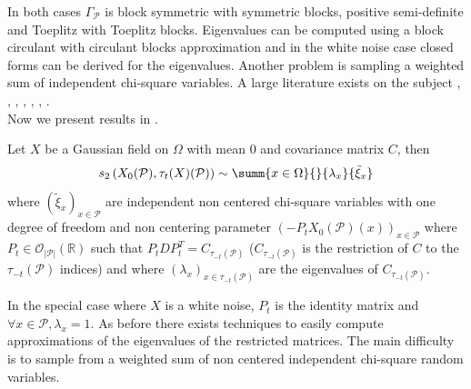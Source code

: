 In both cases $\Gamma_{\mathcal{P}}$ is block symmetric with symmetric blocks, positive semi-definite and Toeplitz with Toeplitz blocks. Eigenvalues can be computed using a block circulant with circulant blocks approximation and in the white noise case closed forms can be derived for the eigenvalues. Another problem is sampling a weighted sum of independent chi-square variables. A large literature exists on the subject \cite{wood1989f}, \cite{moschopoulos1984distribution}, \cite{box1954some}, \cite{imhof1961computing}, \cite{jensen1972gaussian}, \cite{kotz1967series}, \cite{bodenham2016comparison}.\\
Now we present results in \templatematching .
\begin{prop}
  Let $X$ be a Gaussian field on $\Omega$ with mean $0$ and covariance matrix
  $C$, then
  \[s_2\left(X_0(\mathcal{P}), \tau_t(X)(\mathcal{P}) \right) \sim \summ{x \in
      \Omega}{}{\lambda_x}{\tilde{\xi}_x}\] where
  $\left( \tilde{\xi}_x\right)_{x\in \mathcal{P}}$ are independent non centered
  chi-square variables with one degree of freedom and non centering parameter
  $\left(-P_t X_0(\mathcal{P}) (x) \right)_{x \in \mathcal{P}}$ where
  $P_t \in \mathcal{O}_{\vert \mathcal{P} \vert}\left( \mathbb{R} \right)$ such
  that $P_t D P_t^T = C_{\tau_{-t}\left(\mathcal{P}\right)}$
  ($C_{\tau_{-t}\left(\mathcal{P}\right)}$ is the restriction of $C$ to the
  $\tau_{-t}\left(\mathcal{P}\right)$ indices) and where
  $(\lambda_x)_{x\in\tau_{-t}\left(\mathcal{P}\right)}$ are the eigenvalues of
  $C_{\tau_{-t}\left(\mathcal{P}\right)}$.
\end{prop}
In the special case where $X$ is a white noise, $P_t$ is the identity matrix and ${\forall x \in \mathcal{P}, \lambda_x = 1}$. As before there exists techniques to easily compute approximations of the eigenvalues of the restricted matrices. The main difficulty is to sample from a weighted sum of non centered independent chi-square random variables.\\

